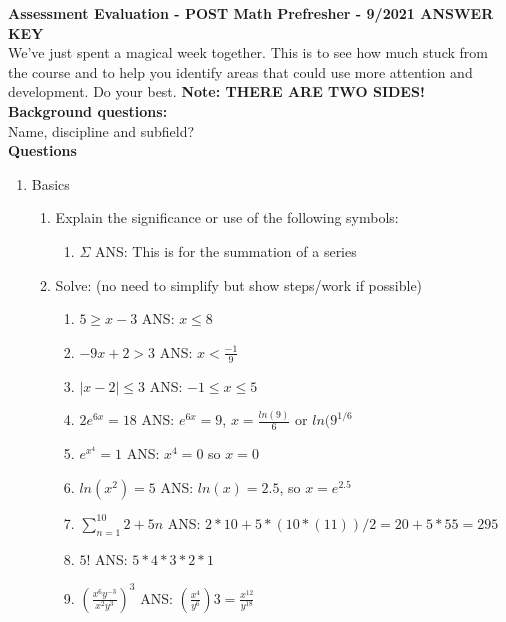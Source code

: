 \documentclass[11pt]{article}
\begin{document}
\noindent\textbf{Assessment Evaluation  - POST Math Prefresher - 9/2021  ANSWER KEY} \\
We've just spent a magical week together. This is to see how much stuck from the course and to help you identify areas that could use more attention and development. Do your best.  \textbf{Note: THERE ARE TWO SIDES!} \\

\noindent \textbf{Background questions:} \\
\indent Name, discipline and subfield? \\

\vspace{3mm}
\noindent \textbf{Questions}

\begin{enumerate}

\item Basics
\begin{enumerate}
\item Explain the significance or use of the following symbols:
\begin{enumerate} 
\item $\Sigma$  \color{gray} ANS: This is for the summation of a series  \color{black}
\end{enumerate}


\item Solve: (no need to simplify but show steps/work if possible)
\begin{enumerate}
\item $5\geq x-3$  \color{gray} ANS: $x \leq 8$ \color{black} \\
\item $-9x+2>3$ \color{gray} ANS: $x < \frac{-1}{9}$ \color{black} \\
\item $|x-2|\leq3$  \color{gray} ANS: $-1 \leq x \leq 5$ \color{black} \\
\item $2e^{6x}=18$  \color{gray} ANS: $e^{6x}=9$, $x=\frac{ln(9)}{6}$ or $ln(9^{1/6}$ \color{black} \\
\item $e^{x^4}=1$ \color{gray} ANS: $x^4=0$ so $x=0$ \color{black} \\
\item $ln(x^2)=5$ \color{gray} ANS: $ln(x)=2.5$, so $x=e^{2.5}$\color{black} \\
\item $\sum_{n=1}^{10} 2+5n $ \color{gray} ANS: $2*10+5*(10*(11))/2=20+5*55=295$ \color{black} \\
\item $5!$\color{gray} ANS: $5*4*3*2*1$ \color{black} \\
\item $(\frac{x^6y^{-3}}{x^2y^3})^3$ \color{gray} ANS: $(\frac{x^4}{y^6})3=\frac{x^{12}}{y^{18}}$\color{black} \\
\end{enumerate}


\end{enumerate}
\end{enumerate}
\end{document}
